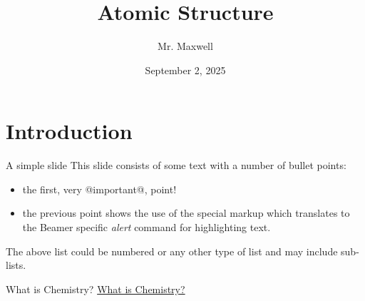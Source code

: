 \documentclass[presentation]{beamer}
\author{Mr. Maxwell}
\date{September 2, 2025}
\title{Atomic Structure}
\begin{document}
\maketitle


\section{Introduction}
\label{sec:orga67d1a8}
\begin{frame}[label={sec:org2e54546}]{A simple slide}
This slide consists of some text with a number of bullet points:

\begin{itemize}
\item the first, very @important@, point!
\item the previous point shows the use of the special markup which
translates to the Beamer specific \emph{alert} command for highlighting
text.
\end{itemize}


The above list could be numbered or any other type of list and may
include sub-lists.
\end{frame}

\begin{frame}[label={sec:orgf32198a}]{What is Chemistry?}
\href{https://www.youtube.com/watch?v=NDPad7BIQpU\&pp=ygUeYnJlYWtpbmcgYmFkIHdoYXQgaXMgY2hlbWlzdHJ5}{What is Chemistry?}
\end{frame}
\end{document}
